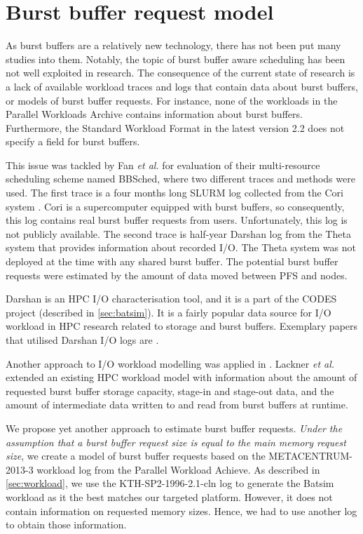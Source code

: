 \documentclass[thesis-en.tex]{subfiles}
\begin{document}
\section{Burst buffer request model} \label{sec:bbrequest}
As burst buffers are a relatively new technology, there has not been put many studies into them. Notably, the topic of burst buffer aware scheduling has been not well exploited in research. The consequence of the current state of research is a lack of available workload traces and logs that contain data about burst buffers, or models of burst buffer requests. For instance, none of the workloads in the Parallel Workloads Archive contains information about burst buffers. Furthermore, the Standard Workload Format in the latest version 2.2 does not specify a field for burst buffers.

This issue was tackled by Fan \textit{et al.} \cite{10.1145/3307681.3325401} for evaluation of their multi-resource scheduling scheme named BBSched, where two different traces and methods were used. The first trace is a four months long SLURM log collected from the Cori system \cite{cori}. Cori is a supercomputer equipped with burst buffers, so consequently, this log contains real burst buffer requests from users. Unfortunately, this log is not publicly available. The second trace is half-year Darshan log from the Theta system \cite{theta} that provides information about recorded I/O. The Theta system was not deployed at the time with any shared burst buffer. The potential burst buffer requests were estimated by the amount of data moved between PFS and nodes.

Darshan is an HPC I/O characterisation tool, and it is a part of the CODES project (described in \autoref{sec:batsim}). It is a fairly popular data source for I/O workload in HPC research related to storage and burst buffers. Exemplary papers that utilised Darshan I/O logs are \cite{6232369,10.1145/2832087.2832091}.

Another approach to I/O workload modelling was applied in \cite{8752797}. Lackner \textit{et al.} extended an existing HPC workload model with information about the amount of requested burst buffer storage capacity, stage-in and stage-out data, and the amount of intermediate data written to and read from burst buffers at runtime.

We propose yet another approach to estimate burst buffer requests. \emph{Under the assumption that a burst buffer request size is equal to the main memory request size}, we create a model of burst buffer requests based on the METACENTRUM-2013-3 workload log from the Parallel Workload Achieve. As described in \autoref{sec:workload}, we use the KTH-SP2-1996-2.1-cln log to generate the Batsim workload as it the best matches our targeted platform. However, it does not contain information on requested memory sizes. Hence, we had to use another log to obtain those information.
\end{document}
